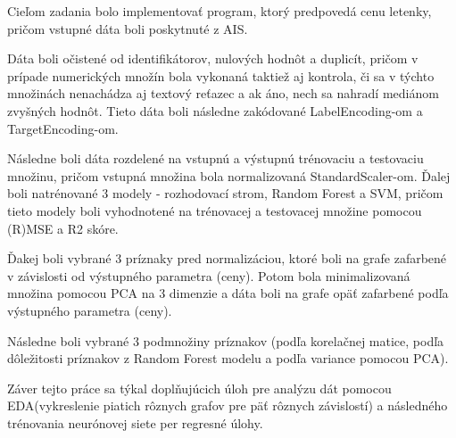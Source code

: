 Cieľom zadania bolo implementovať program, ktorý predpovedá cenu letenky, pričom vstupné dáta boli poskytnuté z AIS. 

Dáta boli očistené od identifikátorov, nulových hodnôt a duplicít, pričom v prípade numerických množín bola vykonaná taktiež aj kontrola, či sa v týchto množinách nenachádza aj textový reťazec a ak áno, nech sa nahradí mediánom zvyšných hodnôt. Tieto dáta boli následne zakódované LabelEncoding-om a TargetEncoding-om. 

Následne boli dáta rozdelené na vstupnú a výstupnú trénovaciu a testovaciu množinu, pričom vstupná množina bola normalizovaná StandardScaler-om. Ďalej boli natrénované 3 modely - rozhodovací strom, Random Forest a SVM, pričom tieto modely boli vyhodnotené na trénovacej a testovacej množine pomocou (R)MSE a R2 skóre.

Ďakej boli vybrané 3 príznaky pred normalizáciou, ktoré boli na grafe zafarbené v závislosti od výstupného parametra (ceny). Potom bola minimalizovaná množina pomocou PCA na 3 dimenzie a dáta boli na grafe opäť zafarbené podľa výstupného parametra (ceny). 

Následne boli vybrané 3 podmnožiny príznakov (podľa korelačnej matice, podľa dôležitosti príznakov z Random Forest modelu a podľa variance pomocou PCA).

Záver tejto práce sa týkal doplňujúcich úloh pre analýzu dát pomocou EDA(vykreslenie piatich rôznych grafov pre päť rôznych závislostí) a následného trénovania neurónovej siete per regresné úlohy.